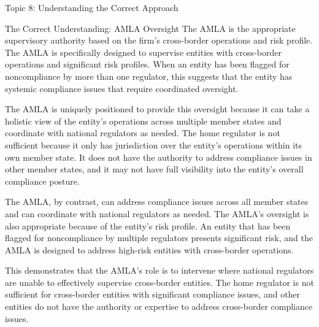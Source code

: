 \documentclass[5pt]{beamer}
\begin{document}
	\begin{frame}{Topic 8: Understanding the Correct Approach}
		\begin{block}{\tiny The Correct Understanding: AMLA Oversight}
			\tiny The AMLA is the appropriate supervisory authority based on the firm's cross-border operations and risk profile. The AMLA is specifically designed to supervise entities with cross-border operations and significant risk profiles. When an entity has been flagged for noncompliance by more than one regulator, this suggests that the entity has systemic compliance issues that require coordinated oversight.
			
			The AMLA is uniquely positioned to provide this oversight because it can take a holistic view of the entity's operations across multiple member states and coordinate with national regulators as needed. The home regulator is not sufficient because it only has jurisdiction over the entity's operations within its own member state. It does not have the authority to address compliance issues in other member states, and it may not have full visibility into the entity's overall compliance posture.
			
			The AMLA, by contrast, can address compliance issues across all member states and can coordinate with national regulators as needed. The AMLA's oversight is also appropriate because of the entity's risk profile. An entity that has been flagged for noncompliance by multiple regulators presents significant risk, and the AMLA is designed to address high-risk entities with cross-border operations.
			
			This demonstrates that the AMLA's role is to intervene where national regulators are unable to effectively supervise cross-border entities. The home regulator is not sufficient for cross-border entities with significant compliance issues, and other entities do not have the authority or expertise to address cross-border compliance issues.
		\end{block}
	\end{frame}
	
\end{document}
